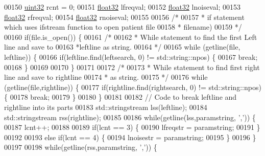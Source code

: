 \begin{DoxyCode}
00150         \hyperlink{definitions_8hpp_a1134b580f8da4de94ca6b1de4d37975e}{uint32} rcnt = 0;
00151         \hyperlink{definitions_8hpp_aacdc525d6f7bddb3ae95d5c311bd06a1}{float32} lfreqval;
00152         \hyperlink{definitions_8hpp_aacdc525d6f7bddb3ae95d5c311bd06a1}{float32} lnoiseval;
00153         \hyperlink{definitions_8hpp_aacdc525d6f7bddb3ae95d5c311bd06a1}{float32} rfreqval;
00154         \hyperlink{definitions_8hpp_aacdc525d6f7bddb3ae95d5c311bd06a1}{float32} rnoiseval;
00155 
00156         \textcolor{comment}{/*}
00157 \textcolor{comment}{         * if statement which uses ifstream function to open patient file }
00158 \textcolor{comment}{         * filename)}
00159 \textcolor{comment}{         */}
00160         \textcolor{keywordflow}{if}(file.is\_open()) \{
00161             \textcolor{comment}{/*}
00162 \textcolor{comment}{             * While statement to find the first Left line and save to }
00163 \textcolor{comment}{             *leftline as string.}
00164 \textcolor{comment}{             */}
00165             \textcolor{keywordflow}{while} (getline(file, leftline)) \{
00166                 \textcolor{keywordflow}{if}(leftline.find(leftsearch, 0) != std::string::npos) \{
00167                     \textcolor{keywordflow}{break};
00168                 \}
00169 
00170             \}
00171 
00172             \textcolor{comment}{/*}
00173 \textcolor{comment}{             * While statement to find first right line and save to rightline}
00174 \textcolor{comment}{             * as string.}
00175 \textcolor{comment}{             */}
00176             \textcolor{keywordflow}{while} (getline(file,rightline)) \{
00177                 \textcolor{keywordflow}{if}(rightline.find(rightsearch, 0) != std::string::npos) \{
00178                     \textcolor{keywordflow}{break};
00179                 \}
00180             \}
00181 
00182             \textcolor{comment}{// Code to break leftline and rightline into its parts}
00183             std::stringstream lss(leftline);
00184             std::stringstream rss(rightline);
00185 
00186             \textcolor{keywordflow}{while}(getline(lss,paramstring, \textcolor{charliteral}{','})) \{
00187                 lcnt++;
00188 
00189                 \textcolor{keywordflow}{if}(lcnt == 3) \{
00190                     lfreqstr = paramstring;
00191                 \}
00192 
00193                 \textcolor{keywordflow}{else} \textcolor{keywordflow}{if}(lcnt == 4) \{
00194                     lnoisestr = paramstring;
00195                 \}
00196             \}
00197 
00198             \textcolor{keywordflow}{while}(getline(rss,paramstring, \textcolor{charliteral}{','})) \{

\end{DoxyCode}
